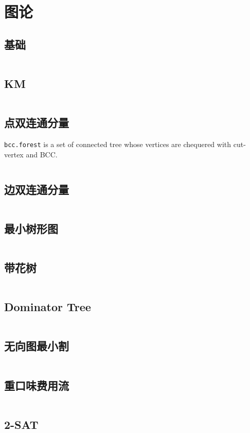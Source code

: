 \chapter{图论}
\section{基础}
\inputminted{cpp}{\source/graph-theory/basis.cpp}
\section{KM}
\inputminted{cpp}{\source/graph-theory/KM.cpp}
\section{点双连通分量}
\texttt{bcc.forest} is a set of connected tree whose vertices are chequered with cut-vertex and BCC.
\inputminted{cpp}{\source/graph-theory/biconnected-graph-vertex.cpp}
\section{边双连通分量}
\inputminted{cpp}{\source/graph-theory/biconnected-graph-edge.cpp}
\section{最小树形图}
\inputminted{cpp}{\source/graph-theory/optimum-branching.cpp}
\section{带花树}
\inputminted{cpp}{\source/graph-theory/blossom-algorithm.cpp}
\section{Dominator Tree}
\inputminted{cpp}{\source/graph-theory/dominator-tree.cpp}
\section{无向图最小割}
\inputminted{cpp}{\source/graph-theory/stoer-wagner-algorithm.cpp}
\section{重口味费用流}
\inputminted{cpp}{\source/graph-theory/zkw-cost-flow.cpp}
\section{2-SAT}
\inputminted{cpp}{\source/graph-theory/2-satisfiability.cpp}
